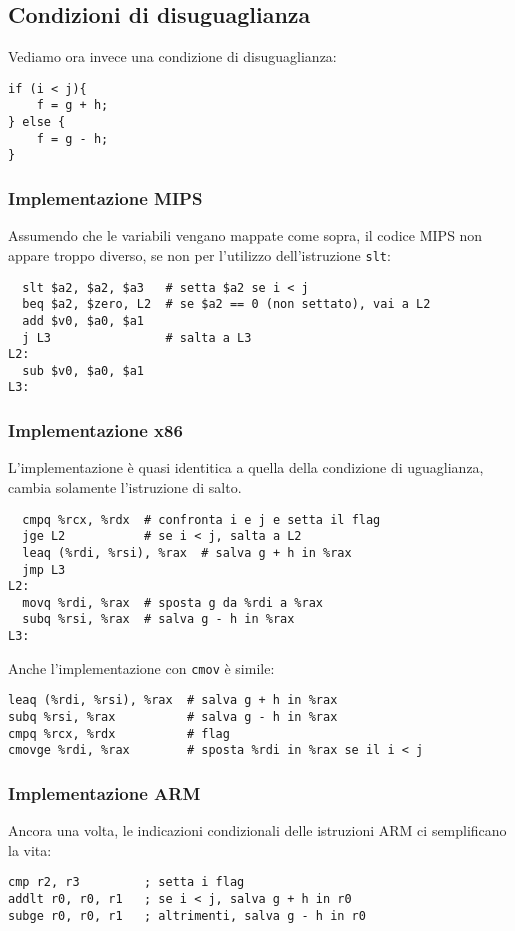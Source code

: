 \documentclass[class=book, crop=false, oneside]{standalone}
\begin{document}
\subsection*{Condizioni di disuguaglianza}
Vediamo ora invece una condizione di disuguaglianza:
\begin{verbatim}
if (i < j){
	f = g + h;
} else {
	f = g - h;
}
\end{verbatim}
\subsubsection{Implementazione MIPS}
Assumendo che le variabili vengano mappate come sopra, il codice MIPS non appare troppo diverso, se non per l'utilizzo dell'istruzione \texttt{slt}:
\begin{verbatim}
  slt $a2, $a2, $a3   # setta $a2 se i < j
  beq $a2, $zero, L2  # se $a2 == 0 (non settato), vai a L2
  add $v0, $a0, $a1
  j L3                # salta a L3
L2:
  sub $v0, $a0, $a1
L3:
\end{verbatim}
\subsubsection{Implementazione x86}
L'implementazione è quasi identitica a quella della condizione di uguaglianza, cambia solamente l'istruzione di salto.
\begin{verbatim}
  cmpq %rcx, %rdx  # confronta i e j e setta il flag
  jge L2           # se i < j, salta a L2
  leaq (%rdi, %rsi), %rax  # salva g + h in %rax
  jmp L3
L2:
  movq %rdi, %rax  # sposta g da %rdi a %rax
  subq %rsi, %rax  # salva g - h in %rax
L3:
\end{verbatim}
Anche l'implementazione con \texttt{cmov} è simile:
\begin{verbatim}
leaq (%rdi, %rsi), %rax  # salva g + h in %rax
subq %rsi, %rax          # salva g - h in %rax
cmpq %rcx, %rdx          # flag
cmovge %rdi, %rax        # sposta %rdi in %rax se il i < j
\end{verbatim}

\subsubsection{Implementazione ARM}
Ancora una volta, le indicazioni condizionali delle istruzioni ARM ci semplificano la vita:
\begin{verbatim}
cmp r2, r3         ; setta i flag
addlt r0, r0, r1   ; se i < j, salva g + h in r0
subge r0, r0, r1   ; altrimenti, salva g - h in r0
\end{verbatim}
\end{document}
